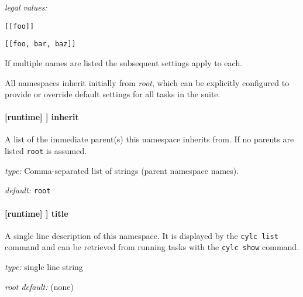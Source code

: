 
\begin{myitemize}
\item {\em legal values:}
    \begin{myitemize}
        \item \lstinline=[[foo]]=
        \item \lstinline=[[foo, bar, baz]]=
    \end{myitemize}
\end{myitemize}

If multiple names are listed the subsequent settings apply to each.

All namespaces inherit initially from {\em root}, which can be
explicitly configured to provide or override default settings
for all tasks in the suite.

\paragraph[inherit]{[runtime] \textrightarrow [[\_\_NAME\_\_]] \textrightarrow inherit}

A list of the immediate parent(s) this namespace inherits from. If no
parents are listed \lstinline=root= is assumed.

\begin{myitemize}
\item {\em type:} Comma-separated list of strings (parent namespace names).
\item {\em default:} \lstinline=root=
\end{myitemize}

\paragraph[title]{[runtime] \textrightarrow [[\_\_NAME\_\_]] \textrightarrow title}

A single line description of this namespace. It is displayed by the
\lstinline=cylc list= command and can be retrieved from running tasks
with the \lstinline=cylc show= command.

\begin{myitemize}
\item {\em type:} single line string
\item {\em root default:} (none)
\end{myitemize}

